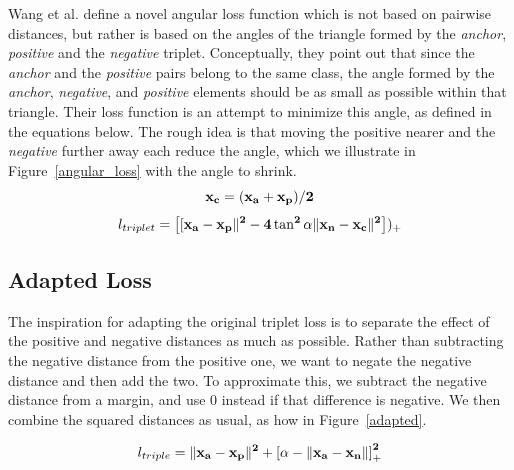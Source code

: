 Wang et al. \cite{DBLP:journals/corr/abs-1708-01682} define a novel
angular loss function which is not based on pairwise distances, but
rather is based on the angles of the triangle formed by the
\textit{anchor}, \textit{positive} and the \textit{negative} triplet.
Conceptually, they point out that since the \textit{anchor} and the
\textit{positive} pairs belong to the same class, the angle formed by
the \textit{anchor}, \textit{negative}, and \textit{positive} elements
should be as small as possible within that triangle.  Their loss
function is an attempt to minimize this angle, as defined in the
equations below.  The rough idea is that moving the positive nearer
and the \textit{negative} further away each reduce the angle, which we
illustrate in Figure~\ref{angular_loss} with the angle to shrink.
\begin{equation}
\bf{x_{c}} = (\bf{x_{a}} + \bf{x_{p}}) / 2
\end{equation}
\begin{equation}
l_{triplet} = \left[[\bf{x_{a}} - \bf{x_{p}}\|^2 - 4 \tan^2 \alpha \|\bf{x_{n}} - \bf{x_{c}}\|^2 \right])_{+}
\end{equation}

\subsection{Adapted Loss}

The inspiration for adapting the original triplet loss is to separate the effect of the positive
and negative distances as much as possible.  Rather than subtracting
the negative distance from the positive one, we want to negate the
negative distance and then add the two.  To approximate this, we
subtract the negative distance from a margin, and use 0 instead if
that difference is negative.  We then combine the squared distances as
usual, as how in Figure~\ref{adapted}.

\begin{equation}
  l_{triple} =  \|\bf{x_a} - \bf{x_p}\|^2 + \left[ \alpha - \|\bf{x_a} -\bf{x_n}\| \right]_+^2
\label{adapted}
\end{equation}


